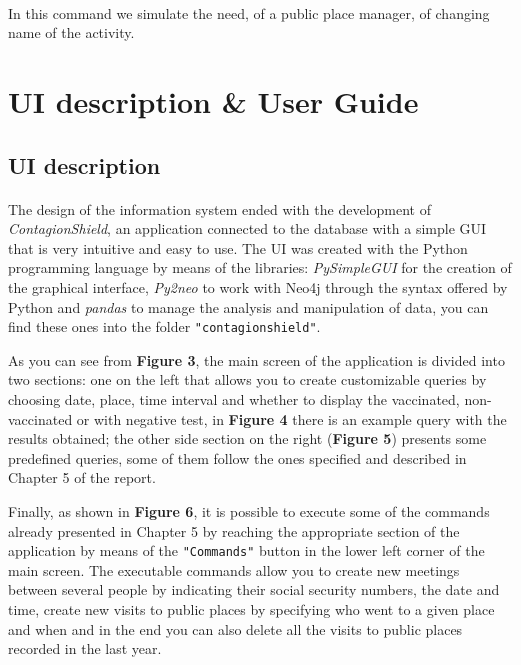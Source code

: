 \documentclass[a4paper,12pt]{article}
\begin{document}
\paragraph{} In this command we simulate the need, of a public place manager, of changing name of the activity.

\clearpage
\section{UI description \& User Guide}
\subsection{UI description}
\paragraph{}The design of the information system ended with the development of \emph{ContagionShield}, an application connected to the database with a simple GUI that is very intuitive and easy to use. The UI was created with the Python programming language by means of the libraries: \emph{PySimpleGUI} for the creation of the graphical interface, \emph{Py2neo} to work with Neo4j through the syntax offered by Python and \emph{pandas} to manage the analysis and manipulation of data, you can find these ones into the folder \texttt{"contagionshield"}. \par

As you can see from \textbf{Figure 3}, the main screen of the application is divided into two sections: one on the left that allows you to create customizable queries by choosing date, place, time interval and whether to display the vaccinated, non-vaccinated or with negative test, in \textbf{Figure 4} there is an example query with the results obtained; the other side section on the right (\textbf{Figure 5}) presents some predefined queries, some of them follow the ones specified and described in Chapter 5 of the report. \par

\pagebreak
Finally, as shown in \textbf{Figure 6}, it is possible to execute some of the commands already presented in Chapter 5 by reaching the appropriate section of the application by means of the \texttt{"Commands"} button in the lower left corner of the main screen. The executable commands allow you to create new meetings between several people by indicating their social security numbers, the date and time, create new visits to public places by specifying who went to a given place and when and in the end you can also delete all the visits to public places recorded in the last year. \par
\end{document}
